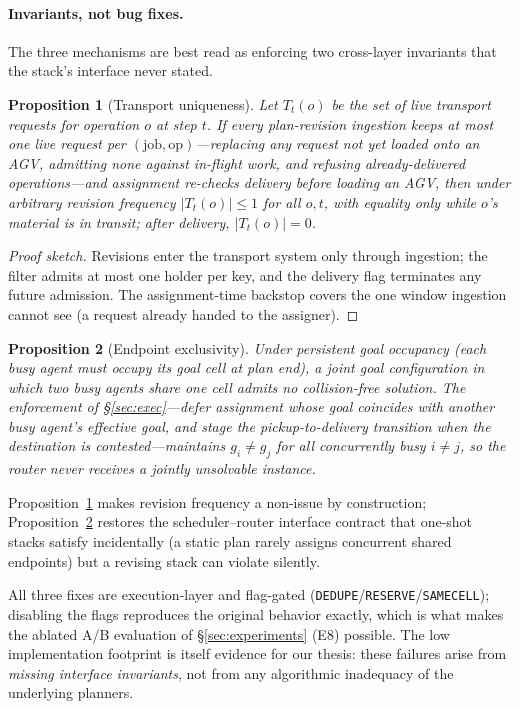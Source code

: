 \documentclass[twocolumn]{article}
\newtheorem{proposition}{Proposition}
\begin{document}
\paragraph{Invariants, not bug fixes.}
The three mechanisms are best read as enforcing two cross-layer
invariants that the stack's interface never stated.

\begin{proposition}[Transport uniqueness]\label{prop:uniq}
Let $T_t(o)$ be the set of live transport requests for operation $o$ at
step $t$. If every plan-revision ingestion keeps at most one live request per
$(\mathrm{job},\mathrm{op})$---replacing any request not yet loaded
onto an AGV, admitting none against in-flight work, and refusing
already-delivered operations---and assignment re-checks delivery before
loading an AGV, then under arbitrary revision frequency $|T_t(o)|\le 1$
for all $o,t$, with equality only while $o$'s material is in transit;
after delivery, $|T_t(o)|=0$.
\end{proposition}

\begin{proof}[Proof sketch]
Revisions enter the transport system only through ingestion; the filter
admits at most one holder per key, and the delivery flag terminates any
future admission. The assignment-time backstop covers the one window
ingestion cannot see (a request already handed to the assigner).
\end{proof}

\begin{proposition}[Endpoint exclusivity]\label{prop:endp}
Under persistent goal occupancy (each busy agent must occupy its goal
cell at plan end), a joint goal configuration in which two busy agents
share one cell admits no collision-free solution. The enforcement of
\S\ref{sec:exec}---defer assignment whose goal coincides with another
busy agent's effective goal, and stage the pickup-to-delivery transition
when the destination is contested---maintains $g_i\ne g_j$ for all
concurrently busy $i\ne j$, so the router never receives a jointly
unsolvable instance.
\end{proposition}

Proposition~\ref{prop:uniq} makes revision frequency a
non-issue by construction; Proposition~\ref{prop:endp} restores the
scheduler--router interface contract that one-shot stacks satisfy
incidentally (a static plan rarely assigns concurrent shared endpoints)
but a revising stack can violate silently.

All three fixes are execution-layer and flag-gated
(\texttt{DEDUPE}/\texttt{RESERVE}/\texttt{SAMECELL}); disabling the
flags reproduces the original behavior exactly, which is what makes the
ablated A/B evaluation of \S\ref{sec:experiments} (E8) possible. The
low implementation footprint is itself evidence for our thesis: these
failures arise from \emph{missing interface invariants}, not from any
algorithmic inadequacy of the underlying planners.
\end{document}
